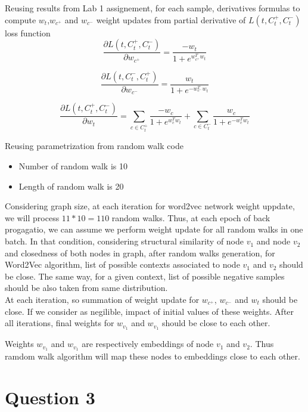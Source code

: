 \documentclass[a4paper]{article}
\begin{document}
Reusing results from Lab 1 assignement, for each sample, derivatives formulas to compute $w_{t}$,$w_{c^{+}}$ and $w_{c^{-}}$ weight updates from partial derivative of $L(t, C_{t}^{+},C_{t}^{-})$ loss function
\begin{equation}
\frac{\partial L(t, C_{t}^{+},C_{t}^{-})}{\partial w_{c^{+}}}=\frac{-w_{t}}{1 + e^{w_{c^{+}}^{T}w_{t}}}
\end{equation}

\begin{equation}
\frac{\partial L(t, C_{t}^{-},C_{t}^{+})}{\partial w_{c^{-}}}=\frac{w_{t}}{1 + e^{-w_{c^{-}}^{T}w_{t}}}
\end{equation}

\begin{equation}
\frac{\partial L(t, C_{t}^{+},C_{t}^{-})}{\partial w_{t}} =
\sum_{c \in C_{t}^{+}}
 \frac{-w_{c}}{1 + e^{w_{c}^{T}w_{t}}}
+
\sum_{c \in C_{t}^{-}}
 \frac{w_{c}}{1 + e^{-w_{c}^{T}w_{t}}}
\end{equation}

Reusing parametrization from random walk code
\begin{itemize}
\item Number of random walk is 10
\item Length of random walk is 20
\end{itemize}

Considering graph size, at each iteration for word2vec network weight uppdate, we will process $11 * 10 = 110$ random walks. Thus, at each epoch of back progagatio, we can assume we perform weight update for all random walks in one batch. In that condition, considering structural similarity of node $v_{1}$ and node $v_{2}$ and closedness of both nodes in graph, after random walks generation, for Word2Vec algorithm, list of possible contexts associated to node $v_{1}$ and $v_{2}$ should be close. The same way, for a given context, list of possible negative samples should be also taken from same distribution.\\
At each iteration, so summation of weight update for $w_{c^{+}}$, $w_{c^{-}}$ and $w_{t}$ should be close. If we consider as negilible, impact of initial values of these weights. After all iterations, final weights for $w_{v_{1}}$ and $w_{v_{1}}$ should be close to each other. 

Weights  $w_{v_{1}}$ and $w_{v_{1}}$ are respectively embeddings of node $v_{1}$ and $v_{2}$. Thus ramdom walk algorithm will map these nodes to embeddings close to each other.
\section{Question 3}
\end{document}
